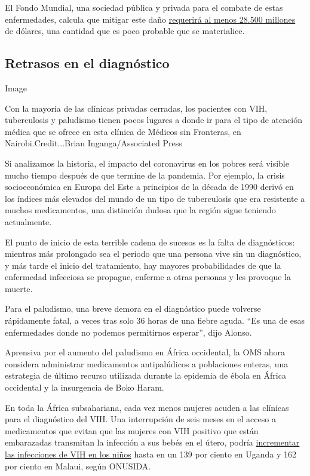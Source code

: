 El Fondo Mundial, una sociedad pública y privada para el combate de
estas enfermedades, calcula que mitigar este daño
\href{https://www.theglobalfund.org/en/news/2020-06-24-global-fund-covid-19-report-deaths-from-hiv-tb-and-malaria-could-almost-double-in-12-months-unless-urgent-action-is-taken/}{requerirá
al menos 28.500 millones} de dólares, una cantidad que es poco probable
que se materialice.

\hypertarget{retrasos-en-el-diagnuxf3stico}{%
\subsection{Retrasos en el
diagnóstico}\label{retrasos-en-el-diagnuxf3stico}}

Image

Con la mayoría de las clínicas privadas cerradas, los pacientes con VIH,
tuberculosis y paludismo tienen pocos lugares a donde ir para el tipo de
atención médica que se ofrece en esta clínica de Médicos sin Fronteras,
en Nairobi.Credit...Brian Inganga/Associated Press

Si analizamos la historia, el impacto del coronavirus en los pobres será
visible mucho tiempo después de que termine de la pandemia. Por ejemplo,
la crisis socioeconómica en Europa del Este a principios de la década de
1990 derivó en los índices más elevados del mundo de un tipo de
tuberculosis que era resistente a muchos medicamentos, una distinción
dudosa que la región sigue teniendo actualmente.

El punto de inicio de esta terrible cadena de sucesos es la falta de
diagnósticos: mientras más prolongado sea el periodo que una persona
vive sin un diagnóstico, y más tarde el inicio del tratamiento, hay
mayores probabilidades de que la enfermedad infecciosa se propague,
enferme a otras personas y les provoque la muerte.

Para el paludismo, una breve demora en el diagnóstico puede volverse
rápidamente fatal, a veces tras solo 36 horas de una fiebre aguda. ``Es
una de esas enfermedades donde no podemos permitirnos esperar'', dijo
Alonso.

Aprensiva por el aumento del paludismo en África occidental, la OMS
ahora considera administrar medicamentos antipalúdicos a poblaciones
enteras, una estrategia de último recurso utilizada durante la epidemia
de ébola en África occidental y la insurgencia de Boko Haram.

En toda la África subsahariana, cada vez menos mujeres acuden a las
clínicas para el diagnóstico del VIH. Una interrupción de seis meses en
el acceso a medicamentos que evitan que las mujeres con VIH positivo que
están embarazadas transmitan la infección a sus bebés en el útero,
podría
\href{https://reliefweb.int/report/world/estimation-potential-impact-covid-19-responses-hiv-epidemic-analysis-using-goals-model}{incrementar
las infecciones de VIH en los niños} hasta en un 139 por ciento en
Uganda y 162 por ciento en Malaui, según ONUSIDA.


